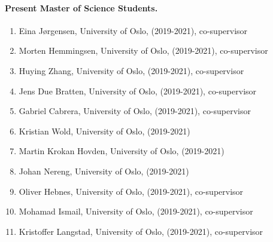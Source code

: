 \documentclass[%
oneside,                 %
final,                   %
10pt]{article}
\begin{document}
\noindent
\paragraph{Present Master of Science Students.}
\begin{enumerate}
\item Eina Jørgensen, University of Oslo, (2019-2021), co-supervisor

\item Morten Hemmingsen, University of Oslo, (2019-2021), co-supervisor

\item Huying Zhang, University of Oslo, (2019-2021), co-supervisor

\item Jens Due Bratten, University of Oslo, (2019-2021), co-supervisor

\item Gabriel Cabrera, University of Oslo, (2019-2021), co-supervisor

\item Kristian Wold, University of Oslo, (2019-2021)

\item Martin Krokan Hovden, University of Oslo, (2019-2021)

\item Johan Nereng, University of Oslo, (2019-2021)

\item Oliver Hebnes, University of Oslo, (2019-2021), co-supervisor

\item Mohamad Ismail, University of Oslo, (2019-2021), co-supervisor

\item Kristoffer Langstad, University of Oslo, (2019-2021), co-supervisor
\end{enumerate}

\noindent
\end{document}
